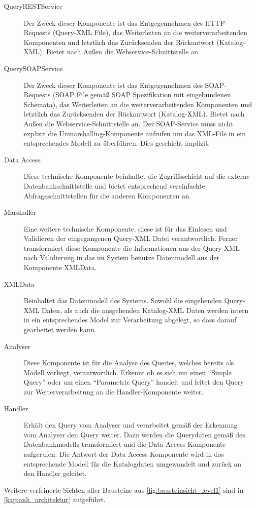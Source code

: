 \begin{description}
\item[QueryRESTService] Der Zweck dieser Komponente ist das Entgegennehmen des HTTP-Requests (Query-XML File), das Weiterleiten an die weiterverarbeitenden Komponenten und letztlich das Zurücksenden der Rückantwort (Katalog-XML). Bietet nach Außen die \gls{Webservice}-Schnittstelle an.
\item[QuerySOAPService] Der Zweck dieser Komponente ist das Entgegennehmen des SOAP-Requests (SOAP File gemäß SOAP Spezifikation mit eingebundenen Schemata), das Weiterleiten an die weiterverarbeitenden Komponenten und letztlich das Zurücksenden der Rückantwort (Katalog-XML). Bietet nach Außen die \gls{Webservice}-Schnittstelle an.
Der SOAP-Service muss nicht explizit die Unmarshalling-Komponente aufrufen um das XML-File in ein entsprechendes Modell zu überführen. Dies geschieht implizit. 
\item[Data Access] Diese technische Komponente beinhaltet die Zugriffsschicht auf die externe Datenbankschnittstelle und bietet entsprechend vereinfachte Abfrageschnittstellen für die anderen Komponenten an. 
\item[Marshaller] Eine weitere technische Komponente, diese ist für das Einlesen und Validieren der eingegangenen Query-XML Datei verantwortlich. Ferner transformiert diese Komponente die Informationen aus der Query-XML nach Validierung in das im System benutze Datenmodell aus der Komponente XMLData.
\item[XMLData] Beinhaltet das Datenmodell des Systems. Sowohl die eingehenden Query-XML Daten, als auch die ausgehenden Katalog-XML Daten werden intern in ein entsprechendes Model zur Verarbeitung abgelegt, so dass darauf gearbeitet werden kann.  
\item[Analyser] Diese Komponente ist für die Analyse des Queries, welches bereits als Modell vorliegt, verantwortlich. Erkennt ob es sich um einen \enquote{Simple Query} oder um einen \enquote{Parametric Query} handelt und leitet den Query zur Weiterverarbeitung an die Handler-Komponente weiter. 
\item[Handler] Erhält den Query vom Analyser und verarbeitet gemäß der Erkennung vom Analyser den Query weiter. Dazu werden die Querydaten gemäß des Datenbankmodells transformiert und die Data Access Komponente aufgerufen. Die Antwort der Data Access Komponente wird in das entsprechende Modell für die Katalogdaten umgewandelt und zurück an den Handler geleitet.  
\end{description}

Weitere verfeinerte Sichten aller Bausteine aus \autoref{fig:bausteinsicht_level1} sind in \autoref{kap:anh_architektur} aufgeführt. 
